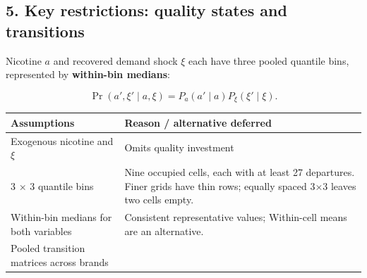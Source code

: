 \documentclass[11pt,]{article}
\begin{document}
\clearpage

\subsection{5. Key restrictions: quality states and
transitions}\label{key-restrictions-quality-states-and-transitions}

Nicotine \(a\) and recovered demand shock \(\xi\) each have three pooled
quantile bins, represented by \textbf{within-bin medians}:

\[
\Pr(a',\xi'\mid a,\xi)=P_a(a'\mid a)P_\xi(\xi'\mid\xi).
\]

\begin{longtable}[]{@{}ll@{}}
\toprule
\begin{minipage}[b]{0.32\columnwidth}\raggedright\strut
Assumptions\strut
\end{minipage} & \begin{minipage}[b]{0.62\columnwidth}\raggedright\strut
Reason / alternative deferred\strut
\end{minipage}\tabularnewline
\midrule
\endhead
\begin{minipage}[t]{0.32\columnwidth}\raggedright\strut
Exogenous nicotine and \(\xi\)\strut
\end{minipage} & \begin{minipage}[t]{0.62\columnwidth}\raggedright\strut
Omits quality investment\strut
\end{minipage}\tabularnewline
\begin{minipage}[t]{0.32\columnwidth}\raggedright\strut
3 × 3 quantile bins\strut
\end{minipage} & \begin{minipage}[t]{0.62\columnwidth}\raggedright\strut
Nine occupied cells, each with at least 27 departures. Finer grids have
thin rows; equally spaced 3×3 leaves two cells empty.\strut
\end{minipage}\tabularnewline
\begin{minipage}[t]{0.32\columnwidth}\raggedright\strut
Within-bin medians for both variables\strut
\end{minipage} & \begin{minipage}[t]{0.62\columnwidth}\raggedright\strut
Consistent representative values; Within-cell means are an
alternative.\strut
\end{minipage}\tabularnewline
\begin{minipage}[t]{0.32\columnwidth}\raggedright\strut
Pooled transition matrices across brands\strut
\end{minipage} & \begin{minipage}[t]{0.62\columnwidth}\raggedright\strut

\end{minipage}
\end{longtable}
\end{document}

